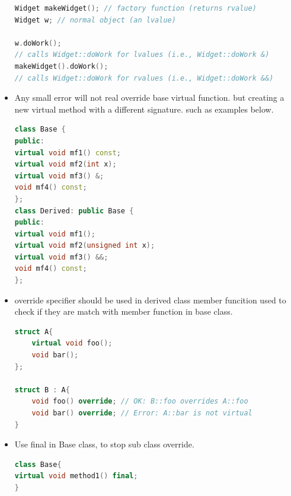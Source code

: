 \documentclass[a4paper,12pt,twoside]{book}
\begin{document}
\begin{itemize}
\begin{lstlisting}[frame=single, language=c++]
Widget makeWidget(); // factory function (returns rvalue)
Widget w; // normal object (an lvalue)

w.doWork();
// calls Widget::doWork for lvalues (i.e., Widget::doWork &)
makeWidget().doWork();
// calls Widget::doWork for rvalues (i.e., Widget::doWork &&)
\end{lstlisting}

\item Any small error will not real override base virtual function. but creating a new virtual method with a different signature. such as examples below.
\begin{lstlisting}[frame=single, language=c++]
class Base {
public:
virtual void mf1() const;
virtual void mf2(int x);
virtual void mf3() &;
void mf4() const;
};
class Derived: public Base {
public:
virtual void mf1();
virtual void mf2(unsigned int x);
virtual void mf3() &&;
void mf4() const;
};
\end{lstlisting}

\item override specifier should be used in derived class member funcition used to check if they are match with member function in base class.
\begin{lstlisting}[frame=single, language=c++]
struct A{
    virtual void foo();
    void bar();
};

struct B : A{
    void foo() override; // OK: B::foo overrides A::foo
    void bar() override; // Error: A::bar is not virtual
}
\end{lstlisting}

\item Use final in Base class, to stop sub class override.
\begin{lstlisting}[frame=single, language=c++, mathescape=true]
class Base{
virtual void method1() final;
}
\end{lstlisting}



\end{itemize}
\end{document}
